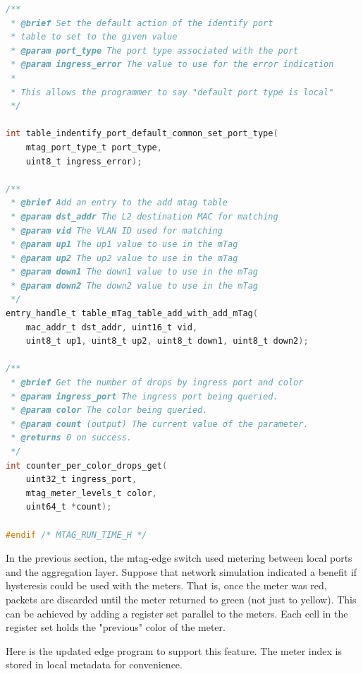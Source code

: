 \documentclass[12pt]{article}
\begin{document}
\begin{lstlisting}[language=C,frame=single,backgroundcolor=\color{nonp4orange}]
/**
 * @brief Set the default action of the identify port
 * table to set to the given value
 * @param port_type The port type associated with the port
 * @param ingress_error The value to use for the error indication
 *
 * This allows the programmer to say "default port type is local"
 */

int table_indentify_port_default_common_set_port_type(
    mtag_port_type_t port_type,
    uint8_t ingress_error);

/**
 * @brief Add an entry to the add mtag table
 * @param dst_addr The L2 destination MAC for matching
 * @param vid The VLAN ID used for matching
 * @param up1 The up1 value to use in the mTag
 * @param up2 The up2 value to use in the mTag
 * @param down1 The down1 value to use in the mTag
 * @param down2 The down2 value to use in the mTag
 */
entry_handle_t table_mTag_table_add_with_add_mTag(
    mac_addr_t dst_addr, uint16_t vid,
    uint8_t up1, uint8_t up2, uint8_t down1, uint8_t down2);

/**
 * @brief Get the number of drops by ingress port and color
 * @param ingress_port The ingress port being queried.
 * @param color The color being queried.
 * @param count (output) The current value of the parameter.
 * @returns 0 on success.
 */
int counter_per_color_drops_get(
    uint32_t ingress_port,
    mtag_meter_levels_t color,
    uint64_t *count);

#endif /* MTAG_RUN_TIME_H */
\end{lstlisting}


In the previous section, the mtag-edge switch used metering between local 
ports and the aggregation layer. Suppose that network simulation indicated 
a benefit if hysteresis could be used with the meters. That is, once the meter 
was red, packets are discarded until the meter returned to green (not just 
to yellow).
This can be achieved by adding a register set parallel to the meters. Each 
cell in the register set holds the "previous" color of the meter. 

Here is the updated edge program to support this feature. The meter index is
stored in local metadata for convenience.
\end{document}
